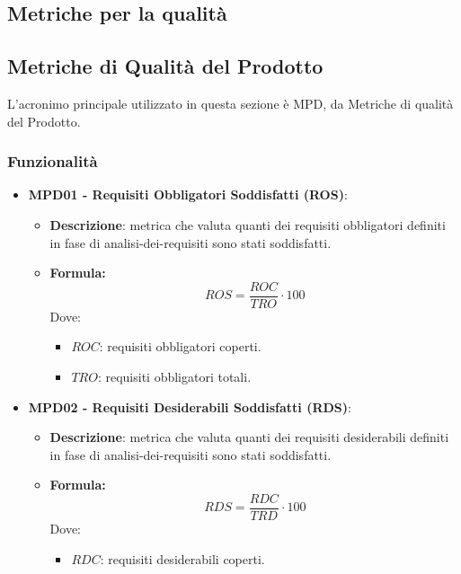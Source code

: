 \documentclass[10pt]{article}
\begin{document}
\begin{justify}
\newpage

\section{Metriche per la qualità}
\label{metriche_qualita}
\subsection{Metriche di Qualità del Prodotto}
L'acronimo principale utilizzato in questa sezione è MPD, da Metriche di qualità del Prodotto.

\subsubsection{Funzionalità}
\begin{itemize}
    \item   \textbf{MPD01 - Requisiti Obbligatori Soddisfatti (ROS)}:
            \begin{itemize}
                \item   \textbf{Descrizione}: metrica che valuta quanti dei requisiti obbligatori definiti in fase di analisi-dei-requisiti sono stati soddisfatti.
                \item   \textbf{Formula:}
                        \[
                        ROS = \frac{ROC}{TRO} \cdot 100
                        \]
                        Dove:
                        \begin{itemize}
                            \item $ROC$: requisiti obbligatori coperti.
                            \item $TRO$: requisiti obbligatori totali.
                        \end{itemize}
            \end{itemize}
    \item   \textbf{MPD02 - Requisiti Desiderabili Soddisfatti (RDS)}:
            \begin{itemize}
                \item   \textbf{Descrizione}: metrica che valuta quanti dei requisiti desiderabili definiti in fase di analisi-dei-requisiti sono stati soddisfatti.
                \item   \textbf{Formula:}
                        \[
                        RDS = \frac{RDC}{TRD} \cdot 100
                        \]
                        Dove:
                        \begin{itemize}
                            \item $RDC$: requisiti desiderabili coperti.

\end{itemize}
\end{itemize}
\end{itemize}
\end{justify}
\end{document}
